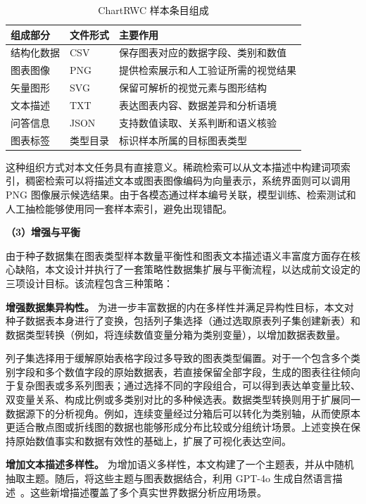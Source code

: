 \begin{table}[htbp]
\centering
\caption[ChartRWC 样本条目组成]{ChartRWC 样本条目组成}
\label{tab:sample_components}
\small
\begin{tabular}{lll}
\toprule
组成部分 & 文件形式 & 主要作用 \\
\midrule
结构化数据 & CSV & 保存图表对应的数据字段、类别和数值 \\
图表图像 & PNG & 提供检索展示和人工验证所需的视觉结果 \\
矢量图形 & SVG & 保留可解析的视觉元素与图形结构 \\
文本描述 & TXT & 表达图表内容、数据差异和分析语境 \\
问答信息 & JSON & 支持数值读取、关系判断和语义核验 \\
图表标签 & 类型目录 & 标识样本所属的目标图表类型 \\
\bottomrule
\end{tabular}
\end{table}

这种组织方式对本文任务具有直接意义。稀疏检索可以从文本描述中构建词项索引，稠密检索可以将描述文本或图表图像编码为向量表示，系统界面则可以调用 PNG 图像展示候选结果。由于各模态通过样本编号关联，模型训练、检索测试和人工抽检能够使用同一套样本索引，避免出现错配。

\noindent\textbf{（3）增强与平衡}

由于种子数据集在图表类型样本数量平衡性和图表文本描述语义丰富度方面存在核心缺陷，本文设计并执行了一套策略性数据集扩展与平衡流程，以达成前文设定的三项设计目标。该流程包含三种策略：

 \textbf{增强数据集异构性。}
为进一步丰富数据的内在多样性并满足异构性目标，本文对种子数据表本身进行了变换，包括列子集选择（通过选取原表列子集创建新表）和数据类型转换（例如，将连续数值变量分箱为类别变量），以增加数据表数量。

列子集选择用于缓解原始表格字段过多导致的图表类型偏置。对于一个包含多个类别字段和多个数值字段的原始数据表，若直接保留全部字段，生成的图表往往倾向于复杂图表或多系列图表；通过选择不同的字段组合，可以得到表达单变量比较、双变量关系、构成比例或多类别对比的多种候选表。数据类型转换则用于扩展同一数据源下的分析视角。例如，连续变量经过分箱后可以转化为类别轴，从而使原本更适合散点图或折线图的数据也能够形成分布比较或分组统计场景。上述变换在保持原始数值事实和数据有效性的基础上，扩展了可视化表达空间。

 \textbf{增加文本描述多样性。}
为增加语义多样性，本文构建了一个主题表，并从中随机抽取主题。随后，将这些主题与图表数据结合，利用 GPT-4o 生成自然语言描述~\cite{chatgpt4o2024}。这些新增描述覆盖了多个真实世界数据分析应用场景。

